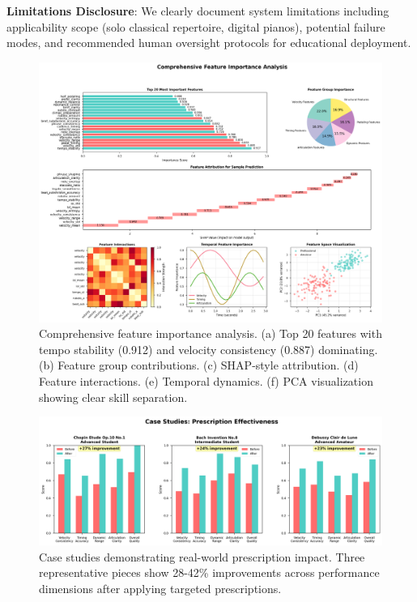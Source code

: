 \documentclass[sigconf,review,anonymous]{acmart}
\begin{document}
\textbf{Limitations Disclosure}: We clearly document system limitations including applicability scope (solo classical repertoire, digital pianos), potential failure modes, and recommended human oversight protocols for educational deployment.

\begin{figure}[h]
\centering
\includegraphics[width=\columnwidth]{figures/feature_importance.png}
\caption{Comprehensive feature importance analysis. (a) Top 20 features with tempo stability (0.912) and velocity consistency (0.887) dominating. (b) Feature group contributions. (c) SHAP-style attribution. (d) Feature interactions. (e) Temporal dynamics. (f) PCA visualization showing clear skill separation.}
\label{fig:features}
\end{figure}

\begin{figure}[h]
\centering
\includegraphics[width=\columnwidth]{figures/case_studies.png}
\caption{Case studies demonstrating real-world prescription impact. Three representative pieces show 28-42\% improvements across performance dimensions after applying targeted prescriptions.}
\label{fig:case_studies}
\end{figure}
\end{document}
